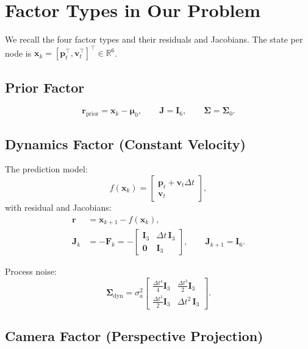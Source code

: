 \documentclass[11pt,a4paper]{article}
\newcommand{\bx}{\bm{x}}
\newcommand{\br}{\bm{r}}
\newcommand{\bp}{\bm{p}}
\newcommand{\bv}{\bm{v}}
\newcommand{\bJ}{\bm{J}}
\newcommand{\bI}{\bm{I}}
\newcommand{\bSigma}{\bm{\Sigma}}
\newcommand{\R}{\mathbb{R}}
\theoremstyle{definition}
\theoremstyle{plain}
\begin{document}
\section{Factor Types in Our Problem}
\label{sec:factors}

We recall the four factor types and their residuals and Jacobians.  The
state per node is $\bx_k = [\bp_t^\top, \bv_t^\top]^\top \in \R^6$.

\subsection{Prior Factor}

\begin{equation}
  \br_{\text{prior}} = \bx_k - \bm{\mu}_0, \qquad
  \bJ = \bI_6, \qquad
  \bSigma = \bSigma_0.
\end{equation}

\subsection{Dynamics Factor (Constant Velocity)}

The prediction model:
\begin{equation}
  f(\bx_k) = \begin{bmatrix} \bp_t + \bv_t \Delta t \\ \bv_t \end{bmatrix},
\end{equation}
with residual and Jacobians:
\begin{align}
  \br &= \bx_{k+1} - f(\bx_k), \\
  \bJ_k &= -\bm{F}_k = -\begin{bmatrix} \bI_3 & \Delta t\,\bI_3 \\ \bm{0} & \bI_3 \end{bmatrix}, \qquad
  \bJ_{k+1} = \bI_6.
\end{align}

Process noise:
\begin{equation}
  \bSigma_{\text{dyn}} = \sigma_a^2
  \begin{bmatrix}
    \frac{\Delta t^4}{4}\bI_3 & \frac{\Delta t^3}{2}\bI_3 \\[3pt]
    \frac{\Delta t^3}{2}\bI_3 & \Delta t^2\,\bI_3
  \end{bmatrix}.
\end{equation}

\subsection{Camera Factor (Perspective Projection)}
\end{document}
